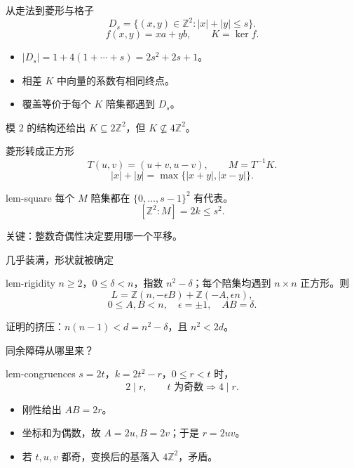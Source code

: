 \documentclass{beamer}
\begin{document}
\begin{frame}{从走法到菱形与格子}
\[D_s=\{(x,y)\in\mathbb Z^2:|x|+|y|\le s\}.\]
\[f(x,y)=xa+yb,\qquad K=\ker f.\]
\begin{itemize}
\item $|D_s|=1+4(1+\cdots+s)=2s^2+2s+1$。
\item 相差 $K$ 中向量的系数有相同终点。
\item 覆盖等价于每个 $K$ 陪集都遇到 $D_s$。
\end{itemize}
模 $2$ 的结构还给出 $K\subseteq2\mathbb Z^2$，但 $K\not\subseteq4\mathbb Z^2$。
\end{frame}
\begin{frame}{菱形转成正方形}
\[T(u,v)=(u+v,u-v),\qquad M=T^{-1}K.\]
\[|x|+|y|=\max\{|x+y|,|x-y|\}.\]
\begin{bookresult}{lem-square}
每个 $M$ 陪集都在 $\{0,\ldots,s-1\}^2$ 有代表。
\[ [\mathbb Z^2:M]=2k\le s^2.\]
\end{bookresult}
关键：整数奇偶性决定要用哪一个平移。
\end{frame}
\begin{frame}{几乎装满，形状就被确定}
\begin{bookresult}{lem-rigidity}
$n\ge2$，$0\le\delta{}<n$，指数 $n^2-\delta$；每个陪集均遇到 $n\times n$ 正方形。则
\[L=\mathbb Z(n,-\epsilon B)+\mathbb Z(-A,\epsilon n),\]
\[0\le A,B<n,\quad \epsilon=\pm1,\quad AB=\delta.\]
\end{bookresult}
证明的挤压：$n(n-1)<d=n^2-\delta$，且 $n^2<2d$。
\end{frame}
\begin{frame}{同余障碍从哪里来？}
\begin{bookresult}{lem-congruences}
$s=2t$，$k=2t^2-r$，$0\le r<t$ 时，
\[2\mid r,\qquad t\text{ 为奇数}\Longrightarrow4\mid r.\]
\end{bookresult}
\begin{itemize}
\item 刚性给出 $AB=2r$。
\item 坐标和为偶数，故 $A=2u,B=2v$；于是 $r=2uv$。
\item 若 $t,u,v$ 都奇，变换后的基落入 $4\mathbb Z^2$，矛盾。
\end{itemize}
\end{frame}
\end{document}
